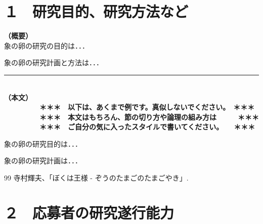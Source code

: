 \documentclass[11pt,a4j,dvipdfmx]{jarticle} 					%
\newcommand{\研究課題名}{象の卵}
\newcommand{\研究機関名}{逢坂大学}
\newcommand{\研究代表者氏名}{湯川秀樹}
\newcommand{\研究期間の最終元号年度}{8}  %
\begin{document}

\section{１　研究目的、研究方法など}

\JSPSInstructions		%
\noindent
\textbf{（概要）}\\
	象の卵の研究の目的は．．．	

	象の卵の研究計画と方法は．．．
	\vspace*{10zw}	%

\noindent
\rule{\linewidth}{1pt}\\
\noindent
\textbf{（本文）}
\textbf{\\　　　　　＊＊＊　以下は、あくまで例です。真似しないでください。　＊＊＊\\
　　　　　＊＊＊　本文はもちろん、節の切り方や論理の組み方は　　　＊＊＊\\
　　　　　＊＊＊　ご自分の気に入ったスタイルで書いてください。　　＊＊＊}

	 象の卵の研究目的は．．．

	象の卵の研究計画は．．．

		

	\vspace{1cm}
	\begin{thebibliography}{99}
		 寺村輝夫、「ぼくは王様 - ぞうのたまごのたまごやき」.
	\end{thebibliography}




\section{２　応募者の研究遂行能力}
\end{document}
